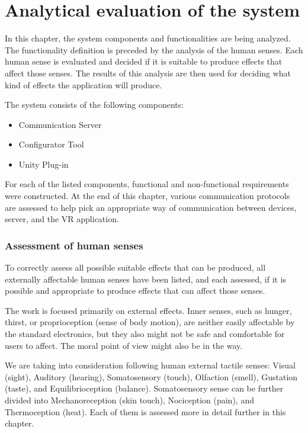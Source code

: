 \chapter{Analytical evaluation of the system}

In this chapter, the system components and functionalities are being analyzed.
The functionality definition is preceded by the analysis of the human senses.
Each human sense is evaluated and decided if it is suitable to produce effects
that affect those senses. The results of this analysis are then used for
deciding what kind of effects the application will produce.


The system consists of the following components:


\begin{itemize}

\item Communication Server

\item Configurator Tool

\item Unity Plug-in

\end{itemize}


For each of the listed components, functional and non-functional requirements
were constructed. At the end of this chapter, various communication protocols
are assessed to help pick an appropriate way of communication between devices,
server, and the VR application.


\hypertarget{x-assessment-of-human-senses}{\subsection*{Assessment of human senses}}
To correctly assess all possible suitable effects that can be produced, all externally affectable human senses have been listed, and each assessed,
if it is possible and appropriate to produce effects that can affect those senses.


The work is focused primarily on external effects. Inner senses, such as
hunger, thirst, or proprioception (sense of body motion), are neither
easily affectable by the standard electronics, but they also might not be safe
and comfortable for users to affect. The moral point of view
might also be in the way.


We are taking into consideration following human external tactile senses:
Visual (sight), Auditory (hearing), Somatosensory (touch), Olfaction (smell),
Gustation (taste), and Equilibrioception (balance). Somatosensory sense can
be further divided into Mechanoreception (skin touch), Nociception (pain), and
Thermoception (heat). Each of them is assessed more in detail further in this
chapter.


